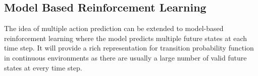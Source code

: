 \subsection{Model Based Reinforcement Learning}
The idea of multiple action prediction can be extended to model-based reinforcement learning where the model predicts multiple future states at each time step. It will provide a rich representation for transition probability function in continuous environments as there are usually a large number of valid future states at every time step.


